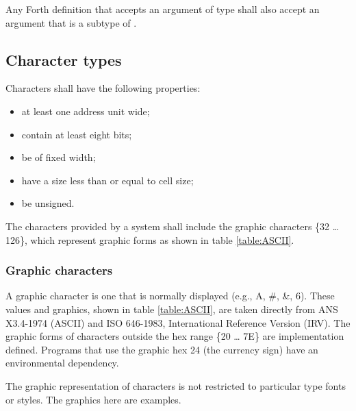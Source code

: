 Any Forth definition that accepts an argument of type 
shall also accept an argument that is a subtype of .


\subsection{Character types} %
\label{usage:char}

Characters shall have the following properties:
\begin{itemize}
\item {} at least one address unit wide; \\[-4ex]
\item contain at least eight bits; \\[-4ex]
\item be of fixed width; \\[-4ex]
\item have a size less than or equal to cell size; \\[-4ex]
\item be unsigned.
\end{itemize}

The characters provided by a system shall include the graphic
characters \{32 {\ldots} 126\}, which represent graphic forms
as shown in table \ref{table:ASCII}.

\subsubsection{Graphic characters} %
\label{usage:ASCII}

A graphic character is one that is normally displayed (e.g.,
A, \#, \&, 6). These values and graphics, shown in table
\ref{table:ASCII}, are taken directly from ANS X3.4-1974 (ASCII)
and ISO 646-1983, International Reference Version (IRV). The
graphic forms of characters outside the hex range \{20 {\ldots}
7E\} are implementation defined. Programs that use the graphic hex
24 (the currency sign) have an environmental dependency.

The graphic representation of characters is not restricted to
particular type fonts or styles. The graphics here are examples.

